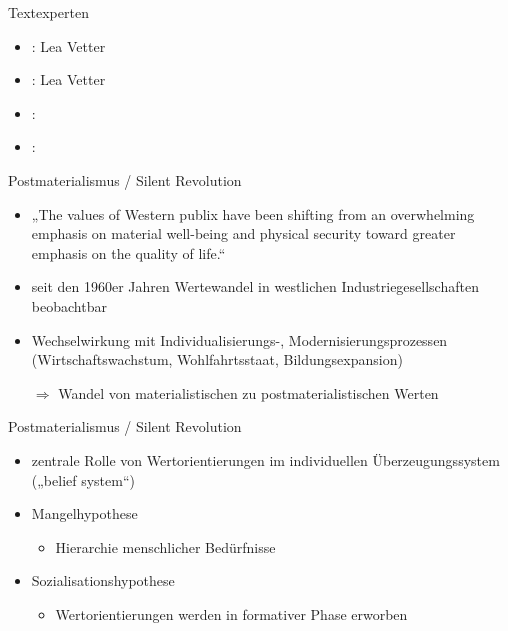 \documentclass[11pt]{beamer}
\begin{document}
\begin{frame}{Textexperten}
	\begin{itemize}
		\item \cite{Welzel2013}: Lea Vetter
		\item \cite{Inglehart2010}: Lea Vetter
		\item \cite{Scherer2020}:
		\item \cite{Welzel2009}:
	\end{itemize}
\end{frame}

\begin{frame}{Postmaterialismus / Silent Revolution \parencite{Inglehart1977}}
	\begin{itemize}
		\item „The values of Western publix have been shifting from an overwhelming emphasis on material well-being and physical security toward greater emphasis on the quality of life.“ \parencite[1]{Inglehart1977}
		\item seit den 1960er Jahren Wertewandel in westlichen Industriegesellschaften beobachtbar
		\item Wechselwirkung mit Individualisierungs-, Modernisierungsprozessen (Wirtschaftswachstum, Wohlfahrtsstaat, Bildungsexpansion)
		\item[$\Rightarrow$] Wandel von materialistischen zu postmaterialistischen Werten
	\end{itemize}		

\end{frame}

\begin{frame}{Postmaterialismus / Silent Revolution \parencite{Inglehart1977}}
	\begin{itemize}
		\item zentrale Rolle von Wertorientierungen im individuellen Überzeugungssystem („belief system“)
		\item Mangelhypothese
			\begin{itemize}
				\item Hierarchie menschlicher Bedürfnisse \parencite{Maslow1943}
			\end{itemize}
		\item Sozialisationshypothese
			\begin{itemize}
				\item Wertorientierungen werden in formativer Phase erworben
			\end{itemize}						
	\end{itemize}		
\end{frame}
\end{document}

